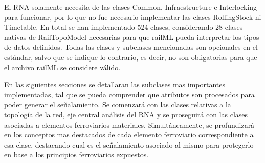     El RNA solamente necesita de las clases Common, Infraestructure e Interlocking para funcionar, por lo que no fue necesario implementar las clases RollingStock ni Timetable. En total se han implementado 524 clases, considerando 28 clases nativas de RailTopoModel necesarias para que railML pueda interpretar los tipos de datos definidos. Todas las clases y subclases mencionadas son opcionales en el estándar, salvo que se indique lo contrario, es decir, no son obligatorias para que el archivo railML se considere válido.

    En las siguientes secciones se detallaran las subclases mas importantes implementadas, tal que se pueda comprender que atributos son procesados para poder generar el señalamiento. Se comenzará con las clases relativas a la topología de la red, eje central análisis del RNA y se proseguirá con las clases asociadas a elementos ferroviarios materiales. Simultáneamente, se profundizará en los conceptos mas destacados de cada elemento ferroviario correspondiente a esa clase, destacando cual es el señalamiento asociado al mismo para protegerlo en base a los principios ferroviarios expuestos.

    
    

    
    
    
    
    
    
    
    
    
    
    